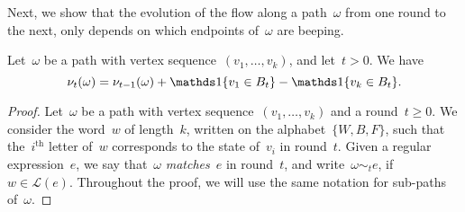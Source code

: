 \documentclass{article}
\begin{document}
Next, we show that the evolution of the flow along a path~$\omega$ from one round to the next, only depends on which endpoints of~$\omega$ are beeping.

\begin{lemma}  \label{lemma:flow_conservation}
    Let~$\omega$ be a path with vertex sequence~$(v_1,\ldots,v_k)$, and let~$t > 0$. We have
    \begin{equation*}
        \nu_{t}(\omega) = \nu_{t-1}(\omega) + \bbOne\{v_1 \in B_t\} - \bbOne\{v_k \in B_t\}.
    \end{equation*}
\end{lemma}

\begin{proof}
    Let~$\omega$ be a path with vertex sequence~$(v_1,\ldots,v_k)$ and a round~$t \geq 0$.
    We consider the word~$w$ of length~$k$, written on the alphabet~$\{W,B,F\}$, such that the~$i^{\text{th}}$ letter of~$w$ corresponds to the state of~$v_i$ in round~$t$. Given a regular expression~$e$, we say that~$\omega$ {\em matches}~$e$ in round~$t$, and write~$\omega \sim_t e$, if~$w \in \mathcal{L}(e)$.
    Throughout the proof, we will use the same notation for sub-paths of~$\omega$.


\end{proof}
\end{document}
